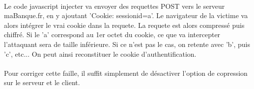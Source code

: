 \paragraph{}
Le code javascript injecter va envoyer des requettes POST vers le serveur maBanque.fr, en y ajoutant 'Cookie: sessionid=a'. Le navigateur de la victime va alors intégrer le vrai cookie dans la requete.
La requete est alors compressé puis chiffré. Si le 'a' correspond au 1er octet du cookie, ce que va intercepter l'attaquant sera de taille inférieure. Si ce n'est pas le cas, on retente avec 'b', puis 'c', etc... 
On peut ainsi reconstituer le cookie d'authentification.

\paragraph{}
Pour corriger cette faille, il suffit simplement de désactiver l'option de copression sur le serveur et le client.
